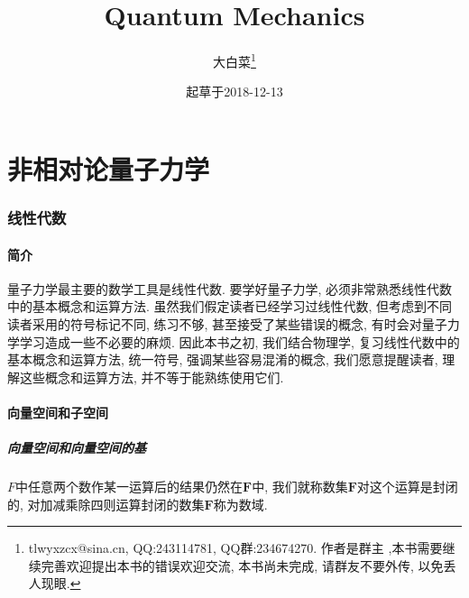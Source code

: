 \documentclass[a4paper,11pt]{article}
\theoremstyle{mystyle}
\begin{document}
\title{Quantum Mechanics}
\author{大白菜\footnote{ tlwyxzcx@sina.cn, QQ:243114781, QQ群:234674270. 作者是群主 ,本书需要继续完善欢迎提出本书的错误欢迎交流, 本书尚未完成, 请群友不要外传, 以免丢人现眼.}}
\date{起草于2018-12-13}
\maketitle
\newpage
\tableofcontents
\thispagestyle{empty}

\newpage
\setcounter{page}{1}
\part{非相对论量子力学}
\section{线性代数}
\subsection{简介}
量子力学最主要的数学工具是线性代数. 要学好量子力学, 必须非常熟悉线性代数中的基本概念和运算方法. 虽然我们假定读者已经学习过线性代数, 但考虑到不同读者采用的符号标记不同, 练习不够, 甚至接受了某些错误的概念, 有时会对量子力学学习造成一些不必要的麻烦. 因此本书之初, 我们结合物理学, 复习线性代数中的基本概念和运算方法, 统一符号, 强调某些容易混淆的概念, 我们愿意提醒读者, 理解这些概念和运算方法, 并不等于能熟练使用它们.
\subsection{向量空间和子空间}
\subsubsection*{向量空间和向量空间的基}
$F$中任意两个数作某一运算后的结果仍然在$\mathbf{F}$中, 我们就称数集$\mathbf{F}$对这个运算是封闭的, 对加减乘除四则运算封闭的数集$\mathbf{F}$称为数域.
\end{document}
